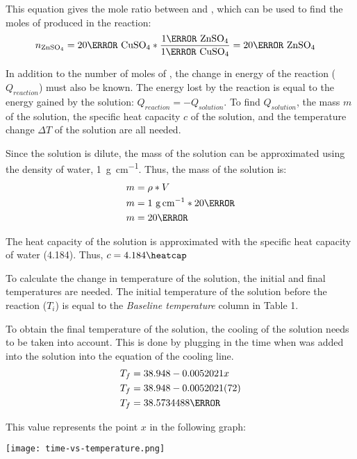 \documentclass[demo, 12pt, notitlepage, letterpaper]{report}
\begin{document}
\centerline{}

This equation gives the mole ratio between  and , which can be used to find the moles of  produced in the reaction:
\begin{align*}
	n_{\ce{ZnSO4}} & = 20\mmol~\ce{CuSO4} * \frac{1\mol~{\ce{ZnSO4}}}{1\mol~{\ce{CuSO4}}} = 20\mmol~{\ce{ZnSO4}}
\end{align*}

In addition to the number of moles of , the change in energy of the reaction ($Q_{reaction}$) must also be known. The energy lost by the reaction is equal to the energy gained by the solution: $Q_{reaction} = -Q_{solution}$. To find $Q_{solution}$, the mass $m$ of the solution, the specific heat capacity $c$ of the solution, and the temperature change $\Delta T$ of the solution are all needed.

Since the solution is dilute, the mass of the solution can be approximated using the density of water, 1~\unit{\gram\per\cm}. Thus, the mass of the solution is:
\begin{align*}
	m & = \rho * V                      \\
	m & = 1~\unit{\gram\per\cm} * 20\ml \\
	m & = 20\gram
\end{align*}

The heat capacity of the solution is approximated with the specific heat capacity of water (4.184\heatcap). Thus, $c = 4.184\heatcap$

To calculate the change in temperature of the solution, the initial and final temperatures are needed. The initial temperature of the solution before the reaction ($T_i$) is equal to the \textit{Baseline temperature} column in Table 1.

To obtain the final temperature of the solution, the cooling of the solution needs to be taken into account. This is done by plugging in the time when  was added into the solution into the equation of the cooling line.
\begin{align*}
	T_f & = 38.948 - 0.0052021x    \\
	T_f & = 38.948 - 0.0052021(72) \\
	T_f & = 38.5734488\celsius
\end{align*}

This value represents the point $x$ in the following graph:

\centerline{\noindent\texttt{[image: time-vs-temperature.png]}}
\end{document}
